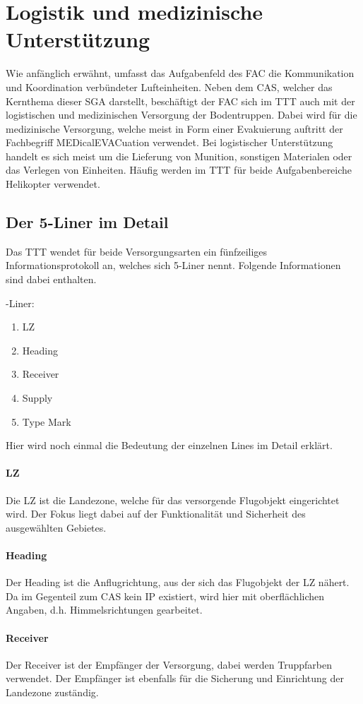 \section{Logistik und medizinische Unterstützung}
Wie anfänglich erwähnt, umfasst das Aufgabenfeld des FAC die Kommunikation und
Koordination verbündeter Lufteinheiten. Neben dem CAS, welcher das Kernthema dieser
SGA darstellt, beschäftigt der FAC sich im TTT auch mit der logistischen und
medizinischen Versorgung der Bodentruppen. Dabei wird für die medizinische Versorgung,
welche meist in Form einer Evakuierung auftritt der Fachbegriff MEDicalEVACuation
verwendet. Bei logistischer Unterstützung handelt es sich meist um die Lieferung von
Munition, sonstigen Materialen oder das Verlegen von Einheiten. Häufig werden im TTT
für beide Aufgabenbereiche Helikopter verwendet.

\subsection{Der 5-Liner im Detail}
Das TTT wendet für beide Versorgungsarten ein fünfzeiliges Informationsprotokoll an,
welches sich 5-Liner nennt. Folgende Informationen sind dabei enthalten.
\par{}-Liner:
\begin{enumerate}
	\item LZ 
	\item Heading
	\item Receiver
	\item Supply
	\item Type Mark
\end{enumerate}

Hier wird noch einmal die Bedeutung der einzelnen Lines im Detail erklärt.
\paragraph*{LZ}
Die LZ ist die Landezone, welche für das versorgende Flugobjekt eingerichtet wird. Der
Fokus liegt dabei auf der Funktionalität und Sicherheit des ausgewählten Gebietes.
\paragraph*{Heading}
Der Heading ist die Anflugrichtung, aus der sich das Flugobjekt der LZ nähert. Da im
Gegenteil zum CAS kein IP existiert, wird hier mit oberflächlichen Angaben, d.h.
Himmelsrichtungen gearbeitet.
\paragraph*{Receiver}
Der Receiver ist der Empfänger der Versorgung, dabei werden Truppfarben verwendet.
Der Empfänger ist ebenfalls für die Sicherung und Einrichtung der Landezone zuständig.
